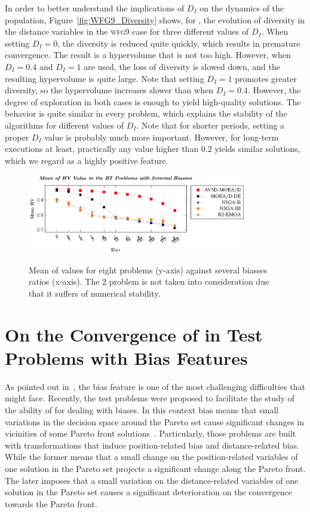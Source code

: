 In order to better understand the implications of $D_I$ on the dynamics of the population, Figure~\ref{fig:WFG9_Diversity}
shows, for \AVSDMOEAD{}, the evolution of diversity in the distance variables in the \textsc{wfg9} case for three different values of $D_I$.
%
When setting $D_I = 0$, the diversity is reduced quite quickly, which results in premature convergence.
%
The result is a hypervolume that is not too high.
%
However, when $D_I = 0.4$ and $D_I = 1$ are used, the loss of diversity is slowed down, and the resulting hypervolume is quite large.
%
Note that setting $D_I = 1$ promotes greater diversity, so the hypervolume increases slower than when
$D_I = 0.4$.
%
However, the degree of exploration in both cases is enough to yield high-quality solutions.
%
The behavior is quite similar in every problem, which explains the stability of the algorithms for
different values of $D_I$.
%
Note that for shorter periods, setting a proper $D_I$ value is probably much more important.
%
However, for long-term executions at least, practically any value higher than $0.2$ yields similar solutions,
which we regard as a highly positive feature.
\begin{figure}[t]
\centering
\includegraphics[width=0.85\textwidth]{images/BIAS-figure0.eps} \\
\caption{Mean of \HV{} values for eight \BTS{} problems (y-axis) against several biasses ratios (x-axis). The \BT{}2 problem is not taken into consideration due that it suffers of numerical stability.}\label{fig:BT}
\end{figure}

\section{On the Convergence of \MOEAS{} in Test Problems with Bias Features}

As pointed out in~\cite{li2016biased, deb1999multi, huband2006review}, the bias feature is one of the most challenging difficulties that \MOEAS{} might face.
%
Recently, the \BTS{} test problems were proposed to facilitate the study of the ability of \MOEAS{} for dealing with biases.
%
In this context bias means that small variations in the decision space around the Pareto set cause significant changes in vicinities of some Pareto front solutions~\cite{huband2006review}.
%
Particularly, those problems are built with transformations that induce position-related bias and distance-related bias.
%
While the former means that a small change on the position-related variables of one solution in the Pareto set projects a significant change along the Pareto front.
%
The later imposes that a small variation on the distance-related variables of one solution in the Pareto set causes a significant deterioration on the convergence towards the Pareto front.
%

